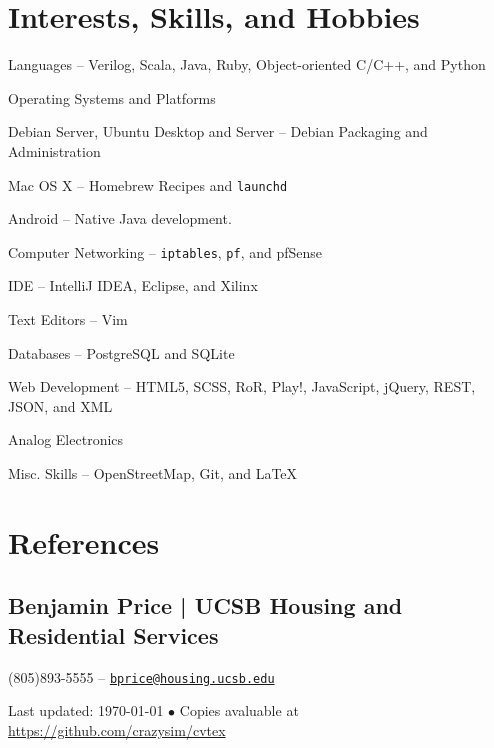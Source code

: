 \documentclass[10pt, letter]{article}
\newcommand{\reference}[4]{
\subsection*{#1 | {\footnotesize{#2}}}
#3 -- \href{mailto:#4}{\texttt{#4}}
}
\newenvironment{packed_item}{
\begin{itemize}
  \setlength{\itemsep}{1pt}
  \setlength{\parskip}{0pt}
  \setlength{\parsep}{0pt}
}{\end{itemize}}
\begin{document}
\begin{multicols}{2}
\section*{Interests, Skills, and Hobbies}

\begin{packed_item}
    \item Languages -- Verilog, Scala, Java, Ruby, Object-oriented C/C++, and Python
    \item Operating Systems and Platforms
        \begin{packed_item}
            \item Debian Server, Ubuntu Desktop and Server -- Debian Packaging and Administration
            \item Mac OS X -- Homebrew Recipes and \texttt{launchd}
            \item Android -- Native Java development.
        \end{packed_item}
    \item Computer Networking -- \texttt{iptables}, \texttt{pf}, and pfSense
    \item IDE -- IntelliJ IDEA, Eclipse, and Xilinx
    \item Text Editors -- Vim
    \item Databases -- PostgreSQL and SQLite
    \item Web Development -- HTML5, SCSS, RoR, Play!, JavaScript, jQuery, REST, JSON, and XML
    \item Analog Electronics 
    \item Misc. Skills -- OpenStreetMap, Git, and \LaTeX
\end{packed_item}

\section*{References}

\reference{Benjamin Price}{UCSB Housing and Residential Services}
{(805)893-5555}{bprice@housing.ucsb.edu}




\end{multicols}

\begin{center}
{\scriptsize  Last updated: \today\- $\bullet$\- 
Copies avaluable at \href{https://github.com/crazysim/cvtex}{https://github.com/crazysim/cvtex}}
\end{center}
\end{document}

